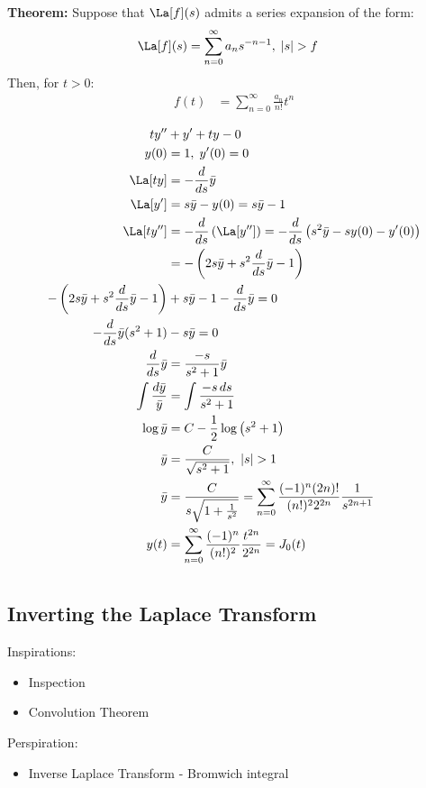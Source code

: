 \documentclass[cplx.tex]{subfiles}
\begin{document}
\textbf{Theorem:} Suppose that $\La[f](s)$ admits a series expansion of the form:
\begin{align}
    \La[f](s) &= \sum_{n=0}^\infty a_n s^{-n-1},\; |s|>f 
\end{align}
Then, for $t>0$:
\begin{align}
    f(t) &= \sum_{n=0}^\infty \frac{a_n}{n!} t^n
\end{align}

\begin{example}
\begin{align}
    ty'' &+ y' + ty - 0 \\
    y(0) &= 1,\; y'(0) = 0 \\
    \La[ty] &= -\frac{d}{ds}\bar{y} \\
    \La[y'] &= s\bar{y} - y(0) = s\bar{y} - 1 \\
    \La[ty''] &= -\frac{d}{ds}\left(\La[y'']\right) = -\frac{d}{ds}\left(s^2\bar{y} - sy(0) - y'(0)\right) \\
              &= -\left(2s\bar{y}+s^2\frac{d}{ds}\bar{y}-1\right) \\
    -\left(2s\bar{y}+s^2\frac{d}{ds}\bar{y}-1\right) &+ s\bar{y} - 1 - \frac{d}{ds}\bar{y} = 0 \\
    -\frac{d}{ds}\bar{y}(s^2+1) &- s\bar{y} = 0 \\
    \frac{d}{ds}\bar{y} &= \frac{-s}{s^2+1}\bar{y} \\
    \int \frac{d\bar{y}}{\bar{y}} &= \int \frac{-s\,ds}{s^2+1} \\
    \log\bar{y} &= C - \frac12\log\left(s^2+1\right) \\
    \bar{y} &= \frac{C}{\sqrt{s^2+1}},~ |s|>1 \\
    \bar{y} &= \frac{C}{s\sqrt{1+\frac{1}{s^2}}} = \sum_{n=0}^\infty \frac{(-1)^n (2n)!}{(n!)^2 2^{2n}} \frac{1}{s^{2n+1}} \\
    y(t) &= \sum_{n=0}^\infty \frac{(-1)^n}{(n!)^2} \frac{t^{2n}}{2^{2n}} = J_0(t)
\end{align}
\end{example}

\chapter{}
\section{Inverting the Laplace Transform}
Inspirations:
\begin{itemize}
    \item Inspection
    \item Convolution Theorem
\end{itemize}
Perspiration:
\begin{itemize}
    \item Inverse Laplace Transform - Bromwich integral
\end{itemize}
\end{document}
